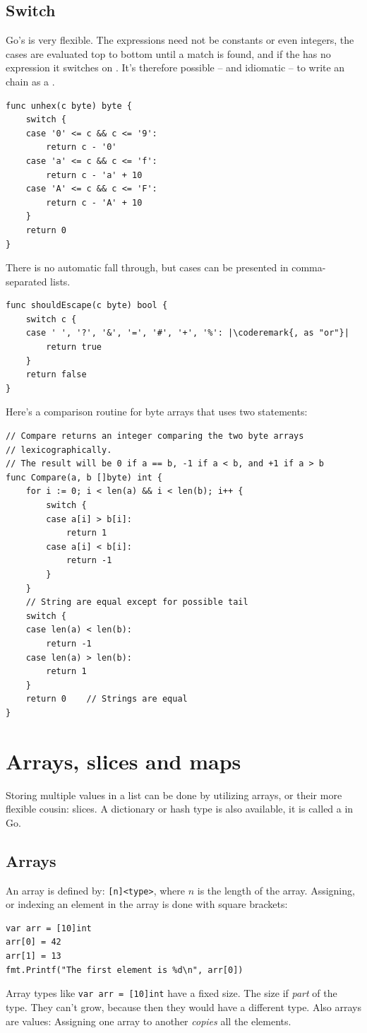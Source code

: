 \subsection{Switch}
Go's  is very flexible. The expressions need
not be
constants or even integers, the cases are evaluated top to bottom until
a match is found, and if the  has no expression it switches on
. It's therefore possible -- and idiomatic -- to write an
 chain as a .
\begin{lstlisting}
func unhex(c byte) byte {
    switch {
    case '0' <= c && c <= '9':
        return c - '0'
    case 'a' <= c && c <= 'f':
        return c - 'a' + 10
    case 'A' <= c && c <= 'F':
        return c - 'A' + 10
    }
    return 0
}
\end{lstlisting}
There is no automatic fall through, but cases can be presented in comma-separated lists.

\begin{lstlisting}
func shouldEscape(c byte) bool {
    switch c {
    case ' ', '?', '&', '=', '#', '+', '%': |\coderemark{, as "or"}|
        return true
    }
    return false
}
\end{lstlisting}
Here's a comparison routine for byte arrays that uses two  statements:

\begin{lstlisting}
// Compare returns an integer comparing the two byte arrays
// lexicographically.
// The result will be 0 if a == b, -1 if a < b, and +1 if a > b
func Compare(a, b []byte) int {
    for i := 0; i < len(a) && i < len(b); i++ {
        switch {
        case a[i] > b[i]:
            return 1
        case a[i] < b[i]:
            return -1
        }
    }
    // String are equal except for possible tail
    switch {
    case len(a) < len(b):
        return -1
    case len(a) > len(b):
        return 1
    }
    return 0	// Strings are equal
}
\end{lstlisting}

\section{Arrays, slices and maps}
\label{sec:arrays}
Storing multiple values in a list can be done by utilizing arrays, or
their more flexible cousin: slices. A dictionary or hash type is also
available, it is called a  in Go.

\subsection{Arrays}
An array is defined by: \verb|[n]<type>|, where $n$ is the length
of the array.
Assigning, or indexing an element in the array is done with square
brackets:
\begin{lstlisting}
var arr = [10]int
arr[0] = 42
arr[1] = 13
fmt.Printf("The first element is %d\n", arr[0])
\end{lstlisting}
Array types like \lstinline{var arr = [10]int} have a fixed size. The
size if \emph{part} of the type.
They can't grow, because then they would have a different type. Also arrays
are values: Assigning one array to another \emph{copies} all the elements.

